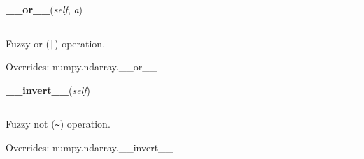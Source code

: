     \vspace{0.5ex}

    \begin{boxedminipage}{\textwidth}

    \raggedright \textbf{\_\_or\_\_}(\textit{self}, \textit{a})

    \vspace{-1.5ex}

    \rule{\textwidth}{0.5\fboxrule}

Fuzzy or (\texttt{|}) operation.
    \vspace{1ex}

      Overrides: numpy.ndarray.\_\_or\_\_

    \end{boxedminipage}

    \vspace{0.5ex}

    \begin{boxedminipage}{\textwidth}

    \raggedright \textbf{\_\_invert\_\_}(\textit{self})

    \vspace{-1.5ex}

    \rule{\textwidth}{0.5\fboxrule}

Fuzzy not (\texttt{{\textasciitilde}}) operation.
    \vspace{1ex}

      Overrides: numpy.ndarray.\_\_invert\_\_

    \end{boxedminipage}

    \label{peach:fuzzy:fuzzy:FuzzySet:set_norm}

    \vspace{0.5ex}

